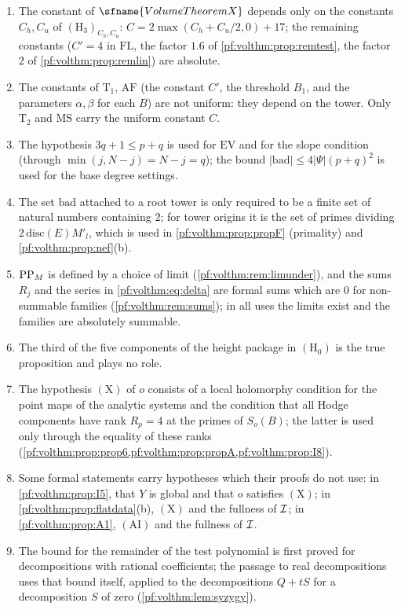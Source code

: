 \begin{remark}\label{pf:volthm:rem:formal}
\begin{enumerate}[label=(\arabic*)]
\item The constant of $\sfname{VolumeTheoremX}$ depends only on the constants $C_h,C_u$ of $(\mathrm{H}_3)_{C_h,C_u}$:
  $C=2\max(C_h+C_u/2,0)+17$; the remaining constants ($C'=4$ in $\mathrm{FL}$, the factor $1.6$ of
  \cref{pf:volthm:prop:remtest}, the factor $2$ of \cref{pf:volthm:prop:remlin}) are absolute.
\item The constants of $\mathrm{T}_1$, $\mathrm{AF}$ (the constant $C'$, the threshold $B_1$, and the parameters
  $\alpha,\beta$ for each $B$) are not uniform: they depend on the tower. Only $\mathrm{T}_2$ and $\mathrm{MS}$
  carry the uniform constant $C$.
\item The hypothesis $3q+1\le p+q$ is used for $\mathrm{EV}$ and for the slope condition (through
  $\min(j,N-j)=N-j=q$); the bound $|\mathrm{bad}|\le4|\Psi|(p+q)^2$ is used for the base degree settings.
\item The set $\mathrm{bad}$ attached to a root tower is only required to be a finite set of natural numbers containing $2$;
  for tower origins it is the set of primes dividing $2\,\mathrm{disc}(E)M'_l$, which is used in
  \cref{pf:volthm:prop:propF} (primality) and \cref{pf:volthm:prop:nef}(b).
\item $\mathrm{PP}_M$ is defined by a choice of limit (\cref{pf:volthm:rem:limunder}), and the sums $R_j$ and the series in
  \eqref{pf:volthm:eq:delta} are formal sums which are $0$ for non-summable families (\cref{pf:volthm:rem:sums}); in
  all uses the limits exist and the families are absolutely summable.
\item The third of the five components of the height package in $(\mathrm{H}_0)$ is the true proposition and
  plays no role.
\item The hypothesis $(\mathrm{X})$ of $o$ consists of a local holomorphy condition for the point maps of the analytic
  systems and the condition that all Hodge components have rank $R_p=4$ at the primes of $S_o(B)$; the latter is used
  only through the equality of these ranks (\cref{pf:volthm:prop:prop6,pf:volthm:prop:propA,pf:volthm:prop:I8}).
\item Some formal statements carry hypotheses which their proofs do not use: in \cref{pf:volthm:prop:I5}, that $Y$ is
  global and that $o$ satisfies $(\mathrm{X})$; in \cref{pf:volthm:prop:flatdata}(b), $(\mathrm{X})$ and the fullness of
  $\mathcal{I}$; in \cref{pf:volthm:prop:A1}, $(\mathrm{AI})$ and the fullness of $\mathcal{I}$.
\item The bound for the remainder of the test polynomial is first proved for decompositions with rational coefficients;
  the passage to real decompositions uses that bound itself, applied to the decompositions $Q+tS$ for a decomposition
  $S$ of zero (\cref{pf:volthm:lem:syzygy}).
\end{enumerate}
\end{remark}

